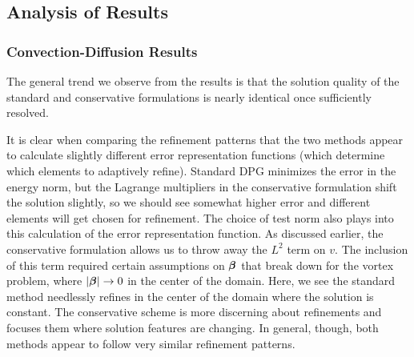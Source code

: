 \documentclass[Proposal.tex]{subfiles}
\begin{document}
\subsection{Analysis of Results}\label{sec:problemAnalysis}
\subsubsection{Convection-Diffusion Results}
The general trend we observe from the results is that the solution quality
of the standard and conservative formulations is nearly identical once
sufficiently resolved.


It is clear when comparing the refinement patterns that the two methods appear
to calculate slightly different error representation functions (which
determine which elements to adaptively refine). Standard DPG minimizes the
error in the energy norm, but the Lagrange multipliers in the conservative
formulation shift the solution slightly, so we should see somewhat higher
error and different elements will get chosen for refinement. The choice of
test norm also plays into this calculation of the error representation
function. As discussed earlier, the conservative formulation allows us to
throw away the $L^2$ term on $v$. The inclusion of this term required certain
assumptions on $\boldsymbol\beta$ \cite{ChanHeuerThanhDemkowicz2012} that break down for
the vortex problem, where $\left| \boldsymbol\beta \right|\rightarrow 0$ in the center of the domain. 
Here, we see the standard method needlessly refines
in the center of the domain where the solution is constant. The conservative
scheme is more discerning about refinements and focuses them where
solution features are changing. In general, though, both methods appear to
follow very similar refinement patterns.
\end{document}
